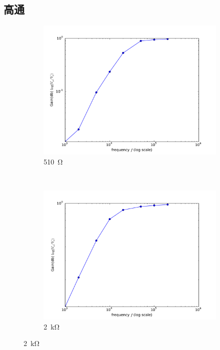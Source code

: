 \documentclass[12pt, a4paper]{article}
\begin{document}
\subsection{高通}
\begin{figure}[H]
  \centering
  \begin{subfigure}[b]{0.45\textwidth}
    \includegraphics[width=1\textwidth]{data/img/q3.pdf}
    \caption{\SI{510}\ohm}
  \end{subfigure}
  ~
  \begin{subfigure}[b]{0.45\textwidth}
    \includegraphics[width=1\textwidth]{data/img/q4.pdf}
    \caption{\SI{2}\kohm}
  \end{subfigure}
\end{figure}
\end{document}
